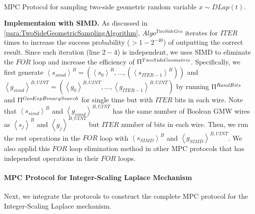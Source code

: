 \begin{protocol}[tbh!]
{{                        \\
                  }}
            \caption{MPC Protocol for sampling two-side geometric random variable $x\sim DLap\left(t\right) $.}
            \label{prot:TwoSideGeometric}
      \end{protocol}
      \FloatBarrier

      \textbf{Implementaion with SIMD.}
      As discussed in \autoref{para:TwoSideGeometricSamplingAlgorithm}, $Algo^{TwoSideGeo}$ iterates for $ITER$ times to increase the success probability ($>1-2^{-40}$) of outputting the correct result. Since each iteration (line $2-4$) is independent, we uses SIMD to eliminate the $FOR$ loop and increase the efficiency of $\Uppi^{TwoSideGeometric}$. Specifically, we first generate $\left\langle s_{simd}\right\rangle^{B} =\left(\left\langle s_0\right\rangle ^B,\ldots, \left(\left\langle s_{ITER-1}\right\rangle ^B \right) \right) $ and $\left\langle g_{simd}\right\rangle^{B,UINT} =\left(\left\langle {g_0}\right\rangle ^{B,UINT} , \ldots, \left\langle {g_{ITER-1}}\right\rangle ^{B,UINT}\right) $ by running $\Uppi^{RandBits}$ and $\Uppi^{GeoExpBinarySearch}$ for single time but with $ITER$ bits in each wire. Note that $\left\langle s_{simd}\right\rangle^{B}$ and $\left\langle g_{simd}\right\rangle^{B,UINT} $ has the same number of Boolean GMW wires as $\left\langle s_{j}\right\rangle ^B$ and $\left\langle {g_j}\right\rangle ^{B,UINT} $ but $ITER$ number of bits in each wire. Then, we run the rest operations in the $FOR$ loop with $\left\langle s_{SIMD}\right\rangle^{B}$ and $\left\langle g_{SIMD}\right\rangle^{B,UINT} $. We also applid this $FOR$ loop elimination method in other MPC protocols that has independent operations in their $FOR$ loops.


      \paragraph{MPC Protocol for Integer-Scaling Laplace Mechanism}
      \label{para:MPCProtocolforInteger-scalingLaplaceMechanism}

      Next, we integrate the protocols to construct the complete MPC protocol for the Integer-Scaling Laplace mechanism.

